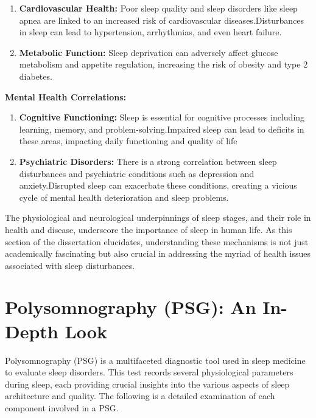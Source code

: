 \documentclass[12pt, a4paper,oneside]{book}
\numberwithin{equation}{section}
\begin{document}
\begin{enumerate}
    \item \textbf{Cardiovascular Health:} Poor sleep quality and sleep disorders like sleep apnea are linked to an increased risk of cardiovascular diseases.Disturbances in sleep can lead to hypertension, arrhythmias, and even heart failure.\cite{Somers2008}
    \item \textbf{Metabolic Function:} Sleep deprivation can adversely affect glucose metabolism and appetite regulation, increasing the risk of obesity and type 2 diabetes.
\end{enumerate}
\textbf{Mental Health Correlations:}
\begin{enumerate}
    \item \textbf{Cognitive Functioning:} Sleep is essential for cognitive processes including learning, memory, and problem-solving.Impaired sleep can lead to deficits in these areas, impacting daily functioning and quality of life

    \item \textbf{Psychiatric Disorders:} There is a strong correlation between sleep disturbances and psychiatric conditions such as depression and anxiety.Disrupted sleep can exacerbate these conditions, creating a vicious cycle of mental health deterioration and sleep problems.

\end{enumerate}
The physiological and neurological underpinnings of sleep stages, and their role in health and disease, underscore the importance of sleep in human life. As this section of the dissertation elucidates, understanding these mechanisms is not just academically fascinating but also crucial in addressing the myriad of health issues associated with sleep disturbances.

\section{Polysomnography (PSG): An In-Depth Look}\label{2.3}
Polysomnography (PSG) is a multifaceted diagnostic tool used in sleep medicine to evaluate sleep disorders. This test records several physiological parameters during sleep, each providing crucial insights into the various aspects of sleep architecture and quality. The following is a detailed examination of each component involved in a PSG.
\end{document}

